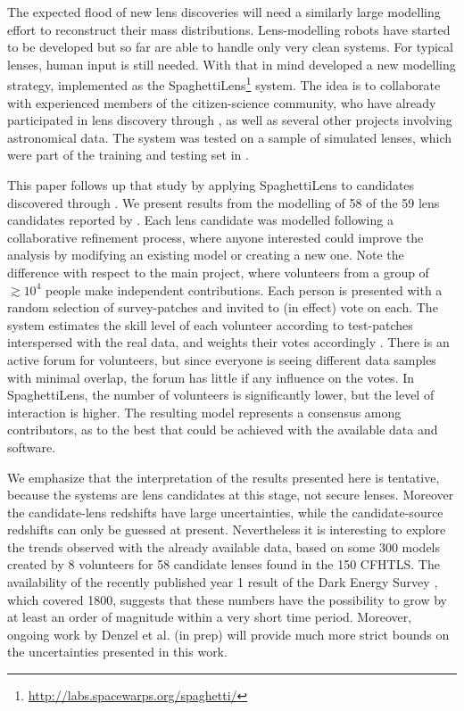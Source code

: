 The expected flood of new lens discoveries will need a similarly large
modelling effort to reconstruct their mass distributions.
Lens-modelling robots have started to be developed
\citep{2017arXiv170807377N,2017arXiv170808842H} but so far are able to
handle only very clean systems.  For typical lenses, human input is
still needed.  With that in mind \cite{2015MNRAS.447.2170K} developed
a new modelling strategy, implemented as the SpaghettiLens\footnote{\url{http://labs.spacewarps.org/spaghetti/}}
system.
The idea is to collaborate with experienced members of the
citizen-science community, who have already participated in lens
discovery through \SW, as well as several other projects involving
astronomical data.  The system was tested on a sample of simulated
lenses, which were part of the training and testing set in \SW.

This paper follows up that study by applying SpaghettiLens to
candidates discovered through \SW.  We present results from
the modelling of 58 of the 59 lens candidates reported by
\cite{2016MNRAS.455.1191M}.  Each lens candidate was modelled
following a collaborative refinement process, where anyone interested
could improve the analysis by modifying an existing model or creating
a new one. Note the difference with respect to the main \SW 
project, where volunteers from a group of $\gtrsim10^4$ people make
independent contributions.  Each person is presented with a random
selection of survey-patches and invited to (in effect) vote on each.
The system estimates the skill level of each volunteer according to
test-patches interspersed with the real data, and weights their votes
accordingly \citep{2016MNRAS.455.1171M}.  There is an active forum for
volunteers, but since everyone is seeing different data samples with
minimal overlap, the forum has little if any influence on the votes.
In SpaghettiLens, the number of volunteers is significantly lower, but
the level of interaction is higher.  The resulting model represents a
consensus among contributors, as to the best that could be achieved
with the available data and software.

We emphasize that the interpretation of the results presented here is
tentative, because the systems are lens candidates at this stage, not
secure lenses.  Moreover the candidate-lens redshifts have large
uncertainties, while the candidate-source redshifts can only be
guessed at present.  Nevertheless it is interesting to explore the
trends observed with the already available data, based on some 300 models
created by 8 volunteers for 58 candidate lenses found in the 150\sqdeg
CFHTLS.  The availability of the recently published year 1 result of the
Dark Energy Survey \citep{2017arXiv170801531D},
which covered 1800\sqdeg, suggests that
these numbers have the possibility to grow by at least an order of
magnitude within a very short time period.
Moreover, ongoing work by Denzel et al. (in prep) will provide much more
strict bounds on the uncertainties presented in this work.

